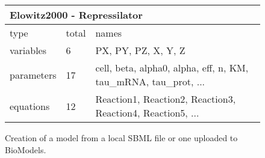 \begin{figure}[t]

\begin{minipage}[t]{\linewidth}

{\centering 

\begin{Shaded}
\begin{Highlighting}[]

\OperatorTok{=}\NormalTok{)  }
\OperatorTok{=}\NormalTok{)  }
\end{Highlighting}
\end{Shaded}

\begin{longtable}{@{}lll@{}}
    \multicolumn{3}{l}{Elowitz2000 - Repressilator} \\
    \toprule\noalign{}
    type & total & names \\
    \midrule\noalign{}
    \endhead
    \bottomrule\noalign{}
    \endlastfoot
    variables  &  6 & PX, PY, PZ, X, Y, Z \\
    parameters & 17 & cell, beta, alpha0, alpha, eff, n, KM, tau\_mRNA, tau\_prot, ... \\
    equations  & 12 & Reaction1, Reaction2, Reaction3, Reaction4, Reaction5, ... \\
\end{longtable}

}

\end{minipage}%

\caption{\label{fig-simbio-io}Creation of a model from a local SBML file
or one uploaded to BioModels.}

\end{figure}
